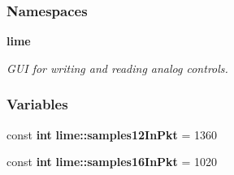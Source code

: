 \subsubsection*{Namespaces}
\begin{DoxyCompactItemize}
\item 
 {\bf lime}
\begin{DoxyCompactList}\small\item\em G\+UI for writing and reading analog controls. \end{DoxyCompactList}\end{DoxyCompactItemize}
\subsubsection*{Variables}
\begin{DoxyCompactItemize}
\item 
const {\bf int} {\bf lime\+::samples12\+In\+Pkt} = 1360
\item 
const {\bf int} {\bf lime\+::samples16\+In\+Pkt} = 1020
\end{DoxyCompactItemize}
